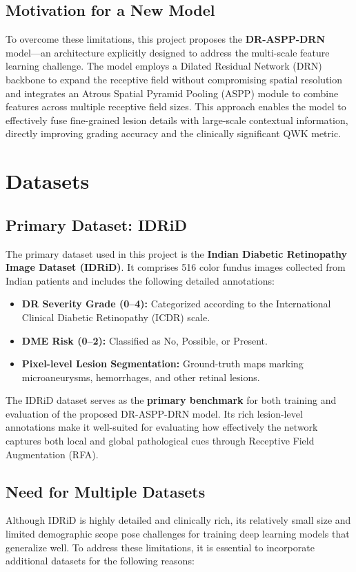 \documentclass[12pt,a4paper]{article}
\begin{document}
\subsection{Motivation for a New Model}
To overcome these limitations, this project proposes the \textbf{DR-ASPP-DRN} model—an architecture explicitly designed to address the multi-scale feature learning challenge. The model employs a Dilated Residual Network (DRN) backbone to expand the receptive field without compromising spatial resolution and integrates an Atrous Spatial Pyramid Pooling (ASPP) module to combine features across multiple receptive field sizes. This approach enables the model to effectively fuse fine-grained lesion details with large-scale contextual information, directly improving grading accuracy and the clinically significant QWK metric.


\section{Datasets}

\subsection{Primary Dataset: IDRiD}
The primary dataset used in this project is the \textbf{Indian Diabetic Retinopathy Image Dataset (IDRiD)}.  
It comprises 516 color fundus images collected from Indian patients and includes the following detailed annotations:
\begin{itemize}
    \item \textbf{DR Severity Grade (0–4):} Categorized according to the International Clinical Diabetic Retinopathy (ICDR) scale.
    \item \textbf{DME Risk (0–2):} Classified as No, Possible, or Present.
    \item \textbf{Pixel-level Lesion Segmentation:} Ground-truth maps marking microaneurysms, hemorrhages, and other retinal lesions.
\end{itemize}

The IDRiD dataset serves as the \textbf{primary benchmark} for both training and evaluation of the proposed DR-ASPP-DRN model. Its rich lesion-level annotations make it well-suited for evaluating how effectively the network captures both local and global pathological cues through Receptive Field Augmentation (RFA).

\subsection{Need for Multiple Datasets}
Although IDRiD is highly detailed and clinically rich, its relatively small size and limited demographic scope pose challenges for training deep learning models that generalize well.  
To address these limitations, it is essential to incorporate additional datasets for the following reasons:
\end{document}
